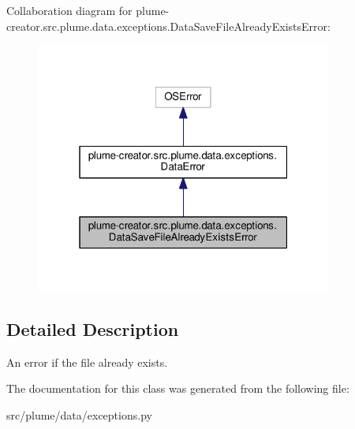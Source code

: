 Collaboration diagram for plume-\/creator.src.\+plume.\+data.\+exceptions.\+Data\+Save\+File\+Already\+Exists\+Error\+:
\nopagebreak
\begin{figure}[H]
\begin{center}
\leavevmode
\includegraphics[width=277pt]{classplume-creator_1_1src_1_1plume_1_1data_1_1exceptions_1_1_data_save_file_already_exists_error__coll__graph}
\end{center}
\end{figure}


\subsection{Detailed Description}
An error if the file already exists. 

The documentation for this class was generated from the following file\+:\begin{DoxyCompactItemize}
\item 
src/plume/data/exceptions.\+py\end{DoxyCompactItemize}
